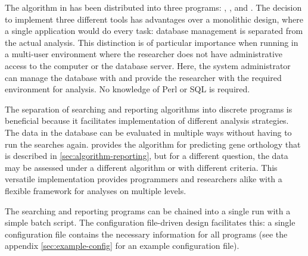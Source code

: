 The algorithm in \pname has been distributed into three programs:
, , and
. The decision to implement three different tools
has advantages over a monolithic design, where a single application would do
every task: database management is separated from the actual analysis. This
distinction is of particular importance when running \pname in a multi-user
environment where the researcher does not have administrative access to the
computer or the database server. Here, the system administrator can manage the
database with  and provide the researcher with the
required environment for analysis. No knowledge of Perl or SQL is required.

The separation of searching and reporting algorithms into discrete programs is
beneficial because it facilitates implementation of different analysis
strategies. The data in the database can be evaluated in multiple ways without
having to run the searches again.  provides the
algorithm for predicting gene orthology that is described in
\autoref{sec:algorithm-reporting}, but for a different question, the data may be
assessed under a different algorithm or with different criteria. This versatile
implementation provides programmers and researchers alike with a flexible
framework for analyses on multiple levels. 

The searching and reporting programs can be chained into a single run with a
simple batch script. The configuration file-driven design facilitates this: a
single configuration file contains the necessary information for all \pname
programs (see the appendix \autoref{sec:example-config} for an example
configuration file).

